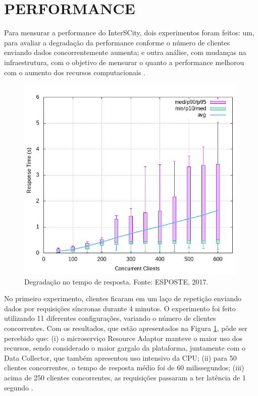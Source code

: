 \section{PERFORMANCE}

Para mensurar a performance do InterSCity, dois experimentos foram feitos:
um, para avaliar a degradação da performance conforme o número de clientes
enviando dados concorrentemente aumenta; e outra análise, com mudanças na %
infraestrutura, com o objetivo de mensurar o quanto a performance melhorou
com o aumento dos recursos computacionais \cite{delesposte2017}.

\begin{figure}
  \centering
    \includegraphics[scale=0.7]{figuras/benchmark1.png}
    \caption{Degradação no tempo de resposta. Fonte: ESPOSTE, 2017.}
  \label{fig:benchmark1}
\end{figure}

No primeiro experimento, clientes ficaram em um laço de repetição enviando
dados por requisições síncronas durante 4 minutos. O experimento foi feito
utilizando 11 diferentes configurações, variando o número de clientes
concorrentes. Com os resultados, que estão apresentados na Figura
\ref{fig:benchmark1}, pôde ser percebido que: (i) o microserviço
Resource Adaptor manteve o maior uso dos recursos, sendo considerado o
maior gargalo da plataforma, juntamente com o Data Collector, que também
apresentou uso intensivo da CPU; (ii) para 50 clientes concorrentes, o
tempo de resposta médio foi de 60 milissegundos; (iii) acima de 250 clientes
concorrentes, as requisições passaram a ter latência de 1 segundo
\cite{delesposte2017}.

